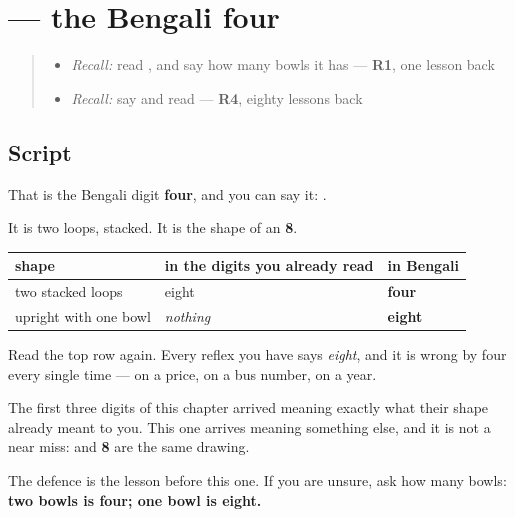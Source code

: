 \section[\texorpdfstring{\bn{৪} (digit four)}{৪ (digit four)}]{ — the Bengali four}

\label{lesson:BN-W07-digit-four}



\begin{quote}
\begin{itemize}
\raggedright
  \item \emph{Recall:} read \textbf{}, and say how many bowls it has — \textbf{R1}, one lesson back
  \item \emph{Recall:} say and read \textbf{} — \textbf{R4}, eighty lessons back
\end{itemize}
\end{quote}

\subsection*{Script}
\begin{quote}
\end{quote}

That is the Bengali digit \textbf{four}, and you can say it: \textbf{}.

It is two loops, stacked. It is the shape of an \textbf{8}.

\noindent
\begin{tabularx}{\linewidth}{@{}>{\raggedright\arraybackslash}X>{\raggedright\arraybackslash}X>{\raggedright\arraybackslash}X@{}}
\toprule
\textbf{shape} & \textbf{in the digits you already read} & \textbf{in Bengali} \\
\midrule
two stacked loops & eight & \textbf{four} \\
upright with one bowl & \emph{nothing} & \textbf{eight} \\
\bottomrule
\end{tabularx}

Read the top row again. Every reflex you have says \emph{eight}, and it is wrong by four every single time — on a price, on a bus number, on a year.

The first three digits of this chapter arrived meaning exactly what their shape already meant to you. This one arrives meaning something else, and it is not a near miss: \textbf{} and \textbf{8} are the same drawing.

The defence is the lesson before this one. If you are unsure, ask how many bowls: \textbf{two bowls is four; one bowl is eight.}

